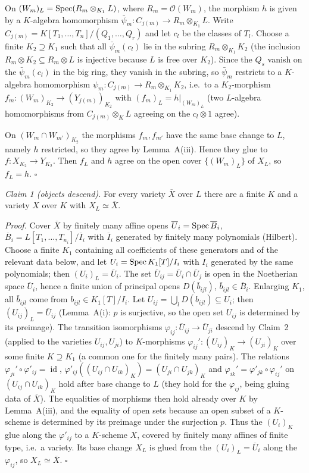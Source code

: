 \documentclass[11pt]{article}
\begin{document}
On $(W_m)_L=\operatorname{Spec}(R_m\otimes_{K_1}L)$, where $R_m=\mathcal O(W_m)$, the morphism $h$ is given by a $K$-algebra homomorphism $\bar\psi_m:C_{j(m)}\to R_m\otimes_{K_1}L$. Write $C_{j(m)}=K[T_1,\dots,T_n]/(Q_1,\dots,Q_r)$ and let $c_l$ be the classes of $T_l$. Choose a finite $K_2\supseteq K_1$ such that all $\bar\psi_m(c_l)$ lie in the subring $R_m\otimes_{K_1}K_2$ (the inclusion $R_m\otimes K_2\subseteq R_m\otimes L$ is injective because $L$ is free over $K_2$). Since the $Q_s$ vanish on the $\bar\psi_m(c_l)$ in the big ring, they vanish in the subring, so $\bar\psi_m$ restricts to a $K$-algebra homomorphism $\psi_m:C_{j(m)}\to R_m\otimes_{K_1}K_2$, i.e.\ to a $K_2$-morphism $f_m:(W_m)_{K_2}\to(Y_{j(m)})_{K_2}$ with $(f_m)_L=h|_{(W_m)_L}$ (two $L$-algebra homomorphisms from $C_{j(m)}\otimes_KL$ agreeing on the $c_l\otimes1$ agree).

On $(W_m\cap W_{m'})_{K_2}$ the morphisms $f_m,f_{m'}$ have the same base change to $L$, namely $h$ restricted, so they agree by Lemma~A(iii). Hence they glue to $f:X_{K_2}\to Y_{K_2}$. Then $f_L$ and $h$ agree on the open cover $\{(W_m)_L\}$ of $X_L$, so $f_L=h$. \hfill$\square$

\emph{Claim 1 (objects descend).} For every variety $\overline X$ over $L$ there are a finite $K$ and a variety $X$ over $K$ with $X_L\simeq\overline X$.

\emph{Proof.} Cover $\overline X$ by finitely many affine opens $\overline U_i=\operatorname{Spec}\overline B_i$, $\overline B_i=L[T_1,\dots,T_{n_i}]/\overline I_i$ with $\overline I_i$ generated by finitely many polynomials (Hilbert). Choose a finite $K_1$ containing all coefficients of these generators and of the relevant data below, and let $U_i=\operatorname{Spec} K_1[T]/I_i$ with $I_i$ generated by the same polynomials; then $(U_i)_L=\overline U_i$. The set $\overline U_{ij}=\overline U_i\cap\overline U_j$ is open in the Noetherian space $\overline U_i$, hence a finite union of principal opens $D(\bar b_{ijl})$, $\bar b_{ijl}\in\overline B_i$. Enlarging $K_1$, all $\bar b_{ijl}$ come from $b_{ijl}\in K_1[T]/I_i$. Let $U_{ij}=\bigcup_lD(b_{ijl})\subseteq U_i$; then $(U_{ij})_L=\overline U_{ij}$ (Lemma~A(i): $p$ is surjective, so the open set $U_{ij}$ is determined by its preimage). The transition isomorphisms $\varphi_{ij}:\overline U_{ij}\to\overline U_{ji}$ descend by Claim~2 (applied to the varieties $U_{ij},U_{ji}$) to $K$-morphisms $\varphi_{ij}':(U_{ij})_{K}\to(U_{ji})_{K}$ over some finite $K\supseteq K_1$ (a common one for the finitely many pairs). The relations $\varphi_{ji}'\circ\varphi'_{ij}=\operatorname{id}$, $\varphi'_{ij}((U_{ij}\cap U_{ik})_K)=(U_{ji}\cap U_{jk})_K$ and $\varphi_{ik}'=\varphi'_{jk}\circ\varphi_{ij}'$ on $(U_{ij}\cap U_{ik})_K$ hold after base change to $L$ (they hold for the $\varphi_{ij}$, being gluing data of $\overline X$). The equalities of morphisms then hold already over $K$ by Lemma~A(iii), and the equality of open sets because an open subset of a $K$-scheme is determined by its preimage under the surjection $p$. Thus the $(U_i)_K$ glue along the $\varphi'_{ij}$ to a $K$-scheme $X$, covered by finitely many affines of finite type, i.e.\ a variety. Its base change $X_L$ is glued from the $(U_i)_L=\overline U_i$ along the $\varphi_{ij}$, so $X_L\simeq\overline X$. \hfill$\square$
\end{document}
